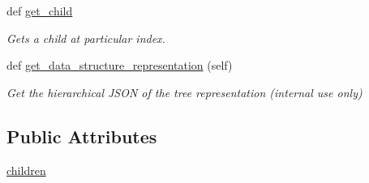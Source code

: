\begin{DoxyCompactItemize}
def \mbox{\hyperlink{classbridges_1_1tree__element_1_1_tree_element_a137df45ceccca2cf489ea6df5719400e}{get\+\_\+child}}
\begin{DoxyCompactList}\small\item\em Gets a child at particular index. \end{DoxyCompactList}\item 
def \mbox{\hyperlink{classbridges_1_1tree__element_1_1_tree_element_ac578f7744d2553c91962b01b57b0e783}{get\+\_\+data\+\_\+structure\+\_\+representation}} (self)
\begin{DoxyCompactList}\small\item\em Get the hierarchical J\+S\+ON of the tree representation (internal use only) \end{DoxyCompactList}\end{DoxyCompactItemize}
\subsection*{Public Attributes}
\begin{DoxyCompactItemize}
\item 
\mbox{\hyperlink{classbridges_1_1tree__element_1_1_tree_element_a09e0e8ad32395e004b6b2d12c39ce390}{children}}
\end{DoxyCompactItemize}
